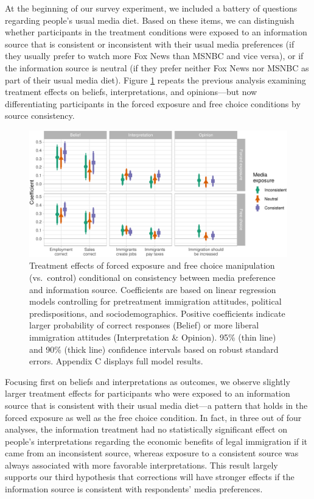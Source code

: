 \documentclass[
  12pt,
]{article}
\begin{document}
At the beginning of our survey experiment, we included a battery of
questions regarding people's usual media diet. Based on these items, we
can distinguish whether participants in the treatment conditions were
exposed to an information source that is consistent or inconsistent with
their usual media preferences (if they usually prefer to watch more Fox
News than MSNBC and vice versa), or if the information source is neutral
(if they prefer neither Fox News nor MSNBC as part of their usual media
diet). Figure \ref{fig:m2} repeats the previous analysis examining
treatment effects on beliefs, interpretations, and opinions---but now
differentiating participants in the forced exposure and free choice
conditions by source consistency.

\singlespace

\begin{figure}
\centering
\includegraphics{ReliableSources_files/figure-latex/m2-1.pdf}
\caption{\label{fig:m2}Treatment effects of forced exposure and free
choice manipulation (vs.~control) conditional on consistency between
media preference and information source. Coefficients are based on
linear regression models controlling for pretreatment immigration
attitudes, political predispositions, and sociodemographics. Positive
coefficients indicate larger probability of correct responses (Belief)
or more liberal immigration attitudes (Interpretation \& Opinion). 95\%
(thin line) and 90\% (thick line) confidence intervals based on robust
standard errors. Appendix C displays full model results.}
\end{figure}

\doublespace

\noindent Focusing first on beliefs and interpretations as outcomes, we
observe slightly larger treatment effects for participants who were
exposed to an information source that is consistent with their usual
media diet---a pattern that holds in the forced exposure as well as the
free choice condition. In fact, in three out of four analyses, the
information treatment had no statistically significant effect on
people's interpretations regarding the economic benefits of legal
immigration if it came from an inconsistent source, whereas exposure to
a consistent source was always associated with more favorable
interpretations. This result largely supports our third hypothesis that
corrections will have stronger effects if the information source is
consistent with respondents' media preferences.
\end{document}
